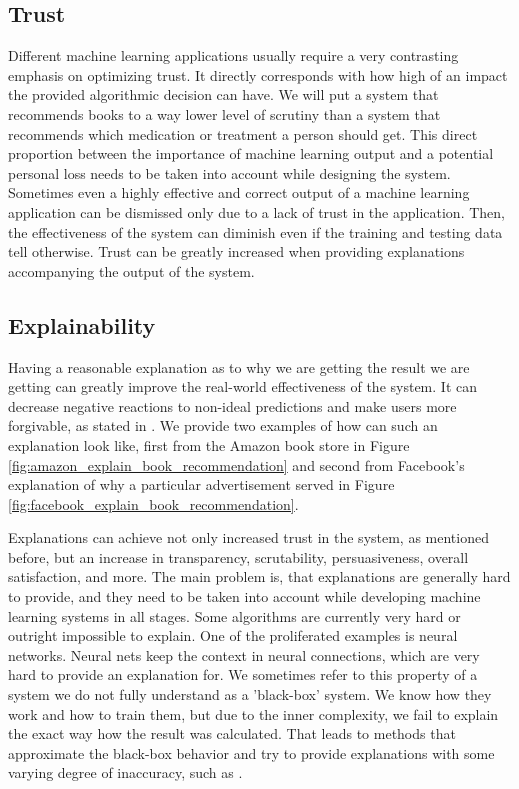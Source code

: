\subsection*{Trust}
Different machine learning applications usually require a very contrasting emphasis on optimizing trust. It directly corresponds with how high of an impact the provided algorithmic decision can have. We will put a system that recommends books to a way lower level of scrutiny than a system that recommends which medication or treatment a person should get. This direct proportion between the importance of machine learning output and a potential personal loss needs to be taken into account while designing the system. Sometimes even a highly effective and correct output of a machine learning application can be dismissed only due to a lack of trust in the application. Then, the effectiveness of the system can diminish even if the training and testing data tell otherwise. Trust can be greatly increased when providing explanations accompanying the output of the system.

\subsection*{Explainability}
Having a reasonable explanation as to why we are getting the result we are getting can greatly improve the real-world effectiveness of the system. It can decrease negative reactions to non-ideal predictions and make users more forgivable, as stated in \cite{tintarev2007survey}. We provide two examples of how can such an explanation look like, first from the Amazon book store in Figure \ref{fig:amazon_explain_book_recommendation} and second from Facebook's explanation of why a particular advertisement served in Figure \ref{fig:facebook_explain_book_recommendation}.

Explanations can achieve not only increased trust in the system, as mentioned before, but an increase in transparency, scrutability, persuasiveness, overall satisfaction, and more. The main problem is, that explanations are generally hard to provide, and they need to be taken into account while developing machine learning systems in all stages. Some algorithms are currently very hard or outright impossible to explain. One of the proliferated examples is neural networks. Neural nets keep the context in neural connections, which are very hard to provide an explanation for. We sometimes refer to this property of a system we do not fully understand as a 'black-box' system. We know how they work and how to train them, but due to the inner complexity, we fail to explain the exact way how the result was calculated. That leads to methods that approximate the black-box behavior and try to provide explanations with some varying degree of inaccuracy, such as \cite{explaining_black_box_2021}.

